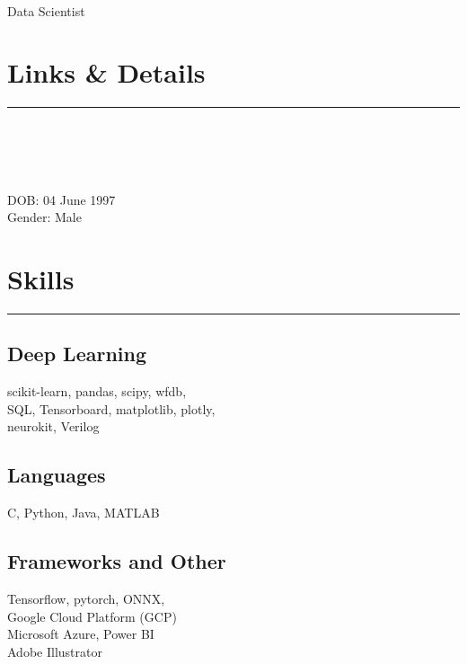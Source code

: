 \documentclass[]{rahulworld-resume}
\begin{document}
%
%

\begin{minipage}[t]{0.33\textwidth} 
\begin{large}
	\\
\end{large}
Data Scientist\\

\section{Links \& Details} 
\noindent\rule{5cm}{0.4pt}

\href{https://github.com/anoushkrit}{} \\
\href{https://www.linkedin.com/in/anoushkrit}{} \\
\href{https://twitter.com/anoushkrit}{} \\

\href{www.anoushkritgoel.com}{} \\

DOB: 04 June 1997\\
Gender: Male
\section{Skills}
\noindent\rule{5cm}{0.4pt}
\subsection{Deep Learning}
scikit-learn, pandas, scipy, wfdb,\\
SQL, Tensorboard, matplotlib, plotly, \\
neurokit, Verilog
\vspace{6pt}
\subsection{Languages}
C, Python, Java, MATLAB
\vspace{6pt}
\subsection{Frameworks and Other}
Tensorflow, pytorch, ONNX,\\
Google Cloud Platform (GCP)\\
Microsoft Azure, Power BI \\
Adobe Illustrator\\


\end{minipage}
\end{document}
